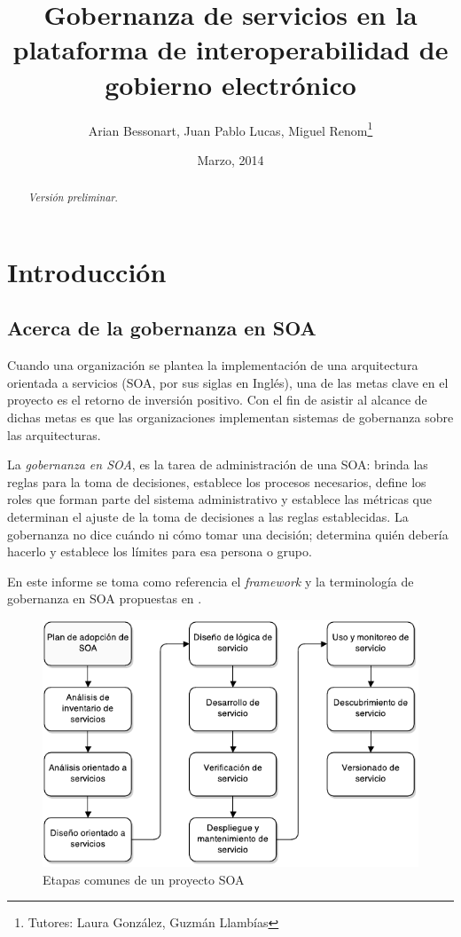\documentclass[11pt]{article}
\title{Gobernanza de servicios en la plataforma de interoperabilidad de gobierno electrónico}
\author{Arian Bessonart, Juan Pablo Lucas, Miguel Renom\thanks{Tutores: Laura González, Guzmán Llambías}}
\date{Marzo, 2014}
\begin{document}
	\maketitle
	\pagebreak

	\begin{abstract}
		\emph{Versión preliminar}.
	\end{abstract}
	\pagebreak

	\section{Introducción}
		\label{sec:introduccion}
		\subsection{Acerca de la gobernanza en SOA}
			Cuando una organización se plantea la implementación de una arquitectura orientada a servicios (SOA, por sus siglas en Inglés), una de las metas clave en el proyecto es el retorno de inversión positivo. Con el fin de asistir al alcance de dichas metas es que las organizaciones implementan sistemas de gobernanza sobre las arquitecturas.

			La \emph{gobernanza en SOA}, es la tarea de administración de una SOA: brinda las reglas para la toma de decisiones, establece los procesos necesarios, define los roles que forman parte del sistema administrativo y establece las métricas que determinan el ajuste de la toma de decisiones a las reglas establecidas. La gobernanza no dice cuándo ni cómo tomar una decisión; determina quién debería hacerlo y establece los límites para esa persona o grupo. \cite{Erl:2011:SGG:1983453}

			En este informe se toma como referencia el \emph{framework} y la terminología de gobernanza en SOA propuestas en \cite{Erl:2011:SGG:1983453}.

			\begin{figure}[h]
				\centering
				\includegraphics[width=\linewidth]{ciclo_de_vida_del_proyecto}
				\caption{Etapas comunes de un proyecto SOA}
				\label{figura:ciclo_de_vida_del_proyecto}
			\end{figure}
\end{document}
